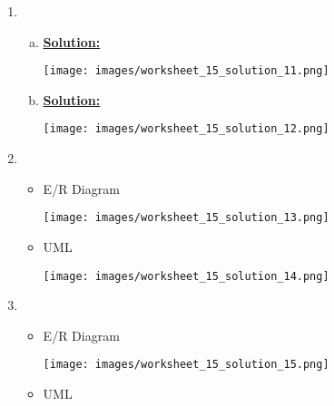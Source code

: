 \documentclass[12pt]{article}
\begin{document}
\begin{enumerate}[1.]
    \item

    \begin{enumerate}[a)]
        \item

        \underline{\textbf{Solution:}}

        \begin{center}
        \texttt{[image: images/worksheet\_15\_solution\_11.png]}
        \end{center}

        \item

        \underline{\textbf{Solution:}}

        \begin{center}
        \texttt{[image: images/worksheet\_15\_solution\_12.png]}
        \end{center}
    \end{enumerate}

    \item

    \begin{itemize}
        \item E/R Diagram

        \begin{center}
        \texttt{[image: images/worksheet\_15\_solution\_13.png]}
        \end{center}

        \item UML

        \begin{center}
        \texttt{[image: images/worksheet\_15\_solution\_14.png]}
        \end{center}
    \end{itemize}

    \item

    \begin{itemize}
        \item E/R Diagram

        \begin{center}
        \texttt{[image: images/worksheet\_15\_solution\_15.png]}
        \end{center}

        \item UML
    \end{itemize}




\end{enumerate}
\end{document}
